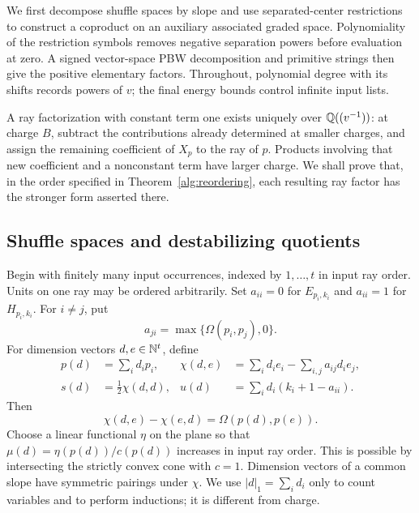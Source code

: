We first decompose shuffle spaces by slope and use separated-center
restrictions to construct a coproduct on an auxiliary associated graded
space. Polynomiality of the restriction symbols removes negative
separation powers before evaluation at zero. A signed vector-space PBW
decomposition and primitive strings then give the positive elementary
factors. Throughout, polynomial degree with its shifts records powers of
$v$; the final energy bounds control infinite input lists.

A ray factorization with constant term one exists uniquely over
$\mathbb Q((v^{-1}))$: at charge $B$, subtract the contributions already
determined at smaller charges, and assign the remaining coefficient of
$X_p$ to the ray of $p$.  Products involving that new coefficient and a
nonconstant term have larger charge.  We shall prove that, in the order
specified in Theorem~\ref{alg:reordering}, each resulting ray factor
has the stronger form asserted there.

\subsection{Shuffle spaces and destabilizing quotients}

Begin with finitely many input occurrences, indexed by $1,\ldots,t$ in
input ray order.  Units on one ray may be ordered arbitrarily.  Set
$a_{ii}=0$ for $E_{p_i,k_i}$ and $a_{ii}=1$ for $H_{p_i,k_i}$.  For
$i\ne j$, put
\[
 a_{ji}=\max\{\Omega(p_i,p_j),0\}.
\]
For dimension vectors $d,e\in\mathbb N^t$, define
\begin{align}
 p(d)&=\sum_i d_ip_i,&
 \chi(d,e)&=\sum_i d_ie_i-\sum_{i,j}a_{ij}d_ie_j,
 \label{alg:euler}\\
 s(d)&=\tfrac12\chi(d,d),&
 u(d)&=\sum_i d_i(k_i+1-a_{ii}).
 \label{alg:shifts}
\end{align}
Then
\begin{equation}\label{alg:skew}
 \chi(d,e)-\chi(e,d)=\Omega(p(d),p(e)).
\end{equation}
Choose a linear functional $\eta$ on the plane so that
$\mu(d)=\eta(p(d))/c(p(d))$ increases in input ray order.
This is possible by intersecting the strictly convex cone with
$c=1$.  Dimension vectors of a common slope have symmetric pairings
under $\chi$.  We use $|d|_1=\sum_i d_i$ only to count variables and to
perform inductions; it is different from charge.

